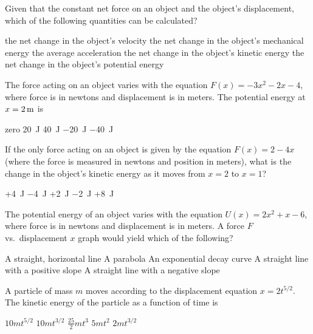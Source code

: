 \documentclass{../../../oss-classkick-exam}
\begin{document}
\begin{multicols*}{2}
\begin{questions}
    \question Given that the constant net force on an object and the object's 
    displacement, which of the following quantities can be calculated?
    \begin{choices}
      \choice the net change in the object's velocity
      \choice the net change in the object's mechanical energy
      \choice the average acceleration
      \choice the net change in the object's kinetic energy
      \choice the net change in the object's potential energy
    \end{choices}
    \vspace{.7in}
    
    \question The force acting on an object varies with the equation
    $F(x)=-3x^2-2x-4$, where force is in newtons and displacement is in meters.
    The potential energy at $x=\SI2{\metre}$ is
    \begin{choices}
      \choice zero
      \choice\SI{20}{\joule}
      \choice\SI{40}{\joule}
      \choice\SI{-20}{\joule}
      \choice\SI{-40}{\joule}
    \end{choices}
    \columnbreak
    
    \question If the only force acting on an object is given by the equation
    $F(x)=2-4x$ (where the force is measured in newtons and position in meters),
    what is the change in the object's kinetic energy as it moves from $x=2$ to
    $x=1$?
    \begin{choices}
      \choice +\SI{4}{\joule}
      \choice \SI{-4}{\joule}
      \choice +\SI{2}{\joule}
      \choice \SI{-2}{\joule}
      \choice +\SI{8}{\joule}
    \end{choices}
    
    \question The potential energy of an object varies with the equation
    $U(x)=2x^2+x-6$, where force is in newtons and displacement is in meters. A
    force $F$ vs.\ displacement $x$ graph would yield which of the following?
    \begin{choices}
      \choice A straight, horizontal line
      \choice A parabola
      \choice An exponential decay curve
      \choice A straight line with a positive slope
      \choice A straight line with a negative slope
    \end{choices}
    \vspace{.7in}
    
    \question A particle of mass $m$ moves according to the displacement
    equation $x=2t^{5/2}$. The kinetic energy of the particle as a function of
    time is
    \begin{choices}
      \choice $10mt^{5/2}$
      \choice $10mt^{3/2}$
      \choice $\displaystyle\frac{25}2mt^3$
      \choice $5mt^2$
      \choice $2mt^{3/2}$
    \end{choices}


\end{questions}
\end{multicols*}
\end{document}
